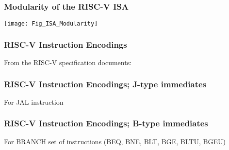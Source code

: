 
\begin{frame}
\frametitle{Modularity of the RISC-V ISA}

\begin{center}
\texttt{[image: Fig\_ISA\_Modularity]}
\end{center}

\end{frame}


\begin{frame}
\frametitle{RISC-V Instruction Encodings}

From the RISC-V specification documents:

\begin{center}
\end{center}

\end{frame}


\begin{frame}
\frametitle{RISC-V Instruction Encodings; J-type immediates}

\begin{center}
\end{center}

\vfill

For JAL instruction

\end{frame}


\begin{frame}
\frametitle{RISC-V Instruction Encodings; B-type immediates}

For BRANCH set of instructions (BEQ, BNE, BLT, BGE, BLTU, BGEU)

\vspace{1ex}

\begin{center}
\end{center}

\end{frame}

